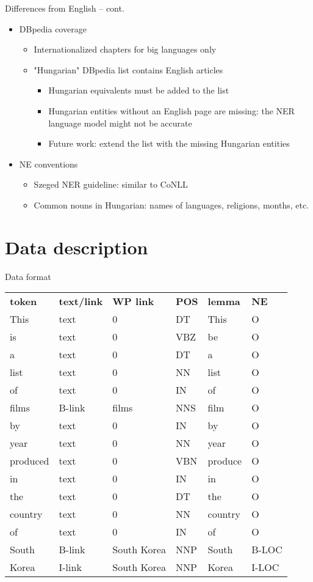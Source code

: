 \documentclass[utf8x,t]{beamer}
\newcommand{\vitem}{\vfill \item}
\begin{document}
\begin{frame}{Differences from English -- cont.}
  \begin{itemize}
  \vitem DBpedia coverage
    \begin{itemize}
    \vitem Internationalized chapters for big languages only
    \vitem "Hungarian" DBpedia list contains English articles %
      \begin{itemize}
      \vitem Hungarian equivalents must be added to the list %
      \vitem Hungarian entities without an English page are missing:
             the NER language model might not be accurate
      \vitem Future work: extend the list with the missing Hungarian entities
      \end{itemize}
    \end{itemize}
  \vitem NE conventions
    \begin{itemize}
    \vitem Szeged NER guideline: similar to CoNLL
    \vitem Common nouns in Hungarian: names of languages, religions, months, etc.
    \end{itemize}
  \end{itemize}
\end{frame}

\section{Data description}

\begin{frame}{Data format}

\begin{tabular}{llllll}
\textbf{token} & \textbf{text/link} & \textbf{WP link} & \textbf{POS} & \textbf{lemma} & \textbf{NE} \\
This & text & 0 &    DT &   This & O \\
is &   text & 0 &    VBZ &  be &   O \\
a &    text & 0 &    DT &   a  &    O\\
list & text & 0 &    NN &   list  & O\\
of &   text & 0 &    IN &   of &     O\\
films  & B-link & films &  NNS &  film & O\\
by &   text & 0 &    IN &   by &     O\\
year & text & 0 &    NN &   year & O\\
produced & text & 0 &    VBN &  produce & O\\
in &   text & 0 &    IN &   in &     O\\
the &  text & 0 &    DT &   the &   O\\
country &text & 0 &    NN &   country &O\\
of &   text & 0 &    IN &   of &     O\\
South &  B-link & South Korea &  NNP &  South  &B-LOC\\
Korea &  I-link & South Korea &  NNP &  Korea   & I-LOC\\
\end{tabular}

\end{frame}
\end{document}
